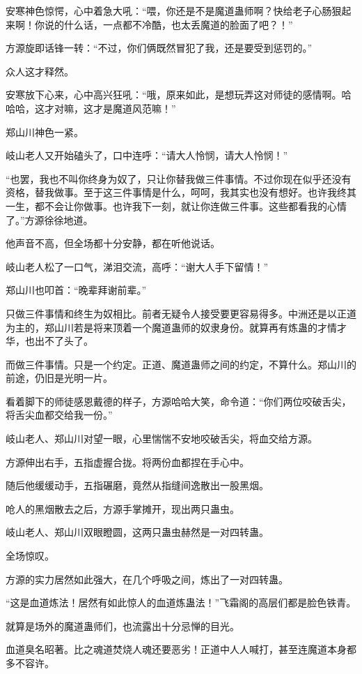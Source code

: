 \begin{this_body}
安寒神色惊愕，心中着急大吼：“喂，你还是不是魔道蛊师啊？快给老子心肠狠起来啊！你说的什么话，一点都不冷酷，也太丢魔道的脸面了吧？！”

方源旋即话锋一转：“不过，你们俩既然冒犯了我，还是要受到惩罚的。”

众人这才释然。

安寒放下心来，心中高兴狂吼：“哦，原来如此，是想玩弄这对师徒的感情啊。哈哈哈，这才对嘛，这才是魔道风范嘛！”

郑山川神色一紧。

岐山老人又开始磕头了，口中连呼：“请大人怜悯，请大人怜悯！”

“也罢，我也不叫你终身为奴了，只让你替我做三件事情。不过你现在似乎还没有资格，替我做事。至于这三件事情是什么，呵呵，我其实也没有想好。也许我终其一生，都不会让你做事。也许我下一刻，就让你连做三件事。这些都看我的心情了。”方源徐徐地道。

他声音不高，但全场都十分安静，都在听他说话。

岐山老人松了一口气，涕泪交流，高呼：“谢大人手下留情！”

郑山川也叩首：“晚辈拜谢前辈。”

只做三件事情和终生为奴相比。前者无疑令人接受要更容易得多。中洲还是以正道为主的，郑山川若是将来顶着一个魔道蛊师的奴隶身份。就算再有炼蛊的才情才华，也出不了头了。

而做三件事情。只是一个约定。正道、魔道蛊师之间的约定，不算什么。郑山川的前途，仍旧是光明一片。

看着脚下的师徒感恩戴德的样子，方源哈哈大笑，命令道：“你们两位咬破舌尖，将舌尖血都交给我一份。”

岐山老人、郑山川对望一眼，心里惴惴不安地咬破舌尖，将血交给方源。

方源伸出右手，五指虚握合拢。将两份血都捏在手心中。

随后他缓缓动手，五指碾磨，竟然从指缝间逸散出一股黑烟。

呛人的黑烟散去之后，方源手掌摊开，现出两只蛊虫。

岐山老人、郑山川双眼瞪圆，这两只蛊虫赫然是一对四转蛊。

全场惊叹。

方源的实力居然如此强大，在几个呼吸之间，炼出了一对四转蛊。

“这是血道炼法！居然有如此惊人的血道炼蛊法！”飞霜阁的高层们都是脸色铁青。

就算是场外的魔道蛊师们，也流露出十分忌惮的目光。

血道臭名昭著。比之魂道焚烧人魂还要恶劣！正道中人人喊打，甚至连魔道本身都多不容许。


\end{this_body}
